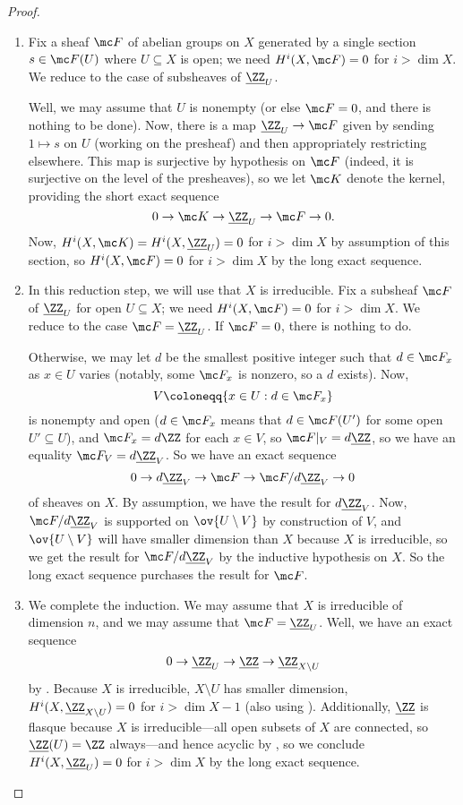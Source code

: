 \documentclass[../notes.tex]{subfiles}
\begin{document}
\begin{proof}
\begin{enumerate}
		\item Fix a sheaf $\mc F$ of abelian groups on $X$ generated by a single section $s\in\mc F(U)$ where $U\subseteq X$ is open; we need $H^i(X,\mc F)=0$ for $i>\dim X$. We reduce to the case of subsheaves of $\underline{\ZZ}_U$.

		Well, we may assume that $U$ is nonempty (or else $\mc F=0$, and there is nothing to be done). Now, there is a map $\underline{\ZZ}_U\to\mc F$ given by sending $1\mapsto s$ on $U$ (working on the presheaf) and then appropriately restricting elsewhere. This map is surjective by hypothesis on $\mc F$ (indeed, it is surjective on the level of the presheaves), so we let $\mc K$ denote the kernel, providing the short exact sequence
		\[0\to\mc K\to\underline{\ZZ}_U\to\mc F\to0.\]
		Now, $H^i(X,\mc K)=H^i(X,\underline{\ZZ}_U)=0$ for $i>\dim X$ by assumption of this section, so $H^i(X,\mc F)=0$ for $i>\dim X$ by the long exact sequence.

		\item In this reduction step, we will use that $X$ is irreducible. Fix a subsheaf $\mc F$ of $\underline{\ZZ}_U$ for open $U\subseteq X$; we need $H^i(X,\mc F)=0$ for $i>\dim X$. We reduce to the case $\mc F=\underline{\ZZ}_U$. If $\mc F=0$, there is nothing to do.

		Otherwise, we may let $d$ be the smallest positive integer such that $d\in\mc F_x$ as $x\in U$ varies (notably, some $\mc F_x$ is nonzero, so a $d$ exists). Now,
		\[V\coloneqq\{x\in U:d\in\mc F_x\}\]
		is nonempty and open ($d\in\mc F_x$ means that $d\in\mc F(U')$ for some open $U'\subseteq U$), and $\mc F_x=d\ZZ$ for each $x\in V$, so $\mc F|_V=d\underline{\ZZ}$, so we have an equality $\mc F_V=d\underline{\ZZ}_V$. So we have an exact sequence
		\[0\to d\underline{\ZZ}_V\to\mc F\to\mc F/d\underline{\ZZ}_V\to0\]
		of sheaves on $X$. By assumption, we have the result for $d\underline{\ZZ}_V$. Now, $\mc F/d\underline{\ZZ}_V$ is supported on $\ov{U\setminus V}$ by construction of $V$, and $\ov{U\setminus V}$ will have smaller dimension than $X$ because $X$ is irreducible, so we get the result for $\mc F/d\underline{\ZZ}_V$ by the inductive hypothesis on $X$. So the long exact sequence purchases the result for $\mc F$.

		\item We complete the induction. We may assume that $X$ is irreducible of dimension $n$, and we may assume that $\mc F=\underline{\ZZ}_U$. Well, we have an exact sequence
		\[0\to\underline{\ZZ}_U\to\underline\ZZ\to\underline{\ZZ}_{X\setminus U}\]
		by . Because $X$ is irreducible, $X\setminus U$ has smaller dimension, $H^i(X,\underline{\ZZ}_{X\setminus U})=0$ for $i>\dim X-1$ (also using ). Additionally, $\underline{\ZZ}$ is flasque because $X$ is irreducible---all open subsets of $X$ are connected, so $\underline{\ZZ}(U)=\ZZ$ always---and hence acyclic by , so we conclude $H^i(X,\underline{\ZZ}_U)=0$ for $i>\dim X$ by the long exact sequence.
		\qedhere
	\end{enumerate}
\end{proof}
\end{document}
